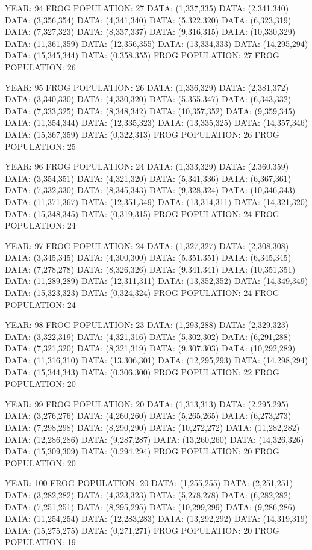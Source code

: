 \documentclass[12pt,a4paper]{article}
\begin{document}
{YEAR: 94
FROG POPULATION: 27
DATA: (1,337,335)
DATA: (2,341,340)
DATA: (3,356,354)
DATA: (4,341,340)
DATA: (5,322,320)
DATA: (6,323,319)
DATA: (7,327,323)
DATA: (8,337,337)
DATA: (9,316,315)
DATA: (10,330,329)
DATA: (11,361,359)
DATA: (12,356,355)
DATA: (13,334,333)
DATA: (14,295,294)
DATA: (15,345,344)
DATA: (0,358,355)
FROG POPULATION: 27
FROG POPULATION: 26

YEAR: 95
FROG POPULATION: 26
DATA: (1,336,329)
DATA: (2,381,372)
DATA: (3,340,330)
DATA: (4,330,320)
DATA: (5,355,347)
DATA: (6,343,332)
DATA: (7,333,325)
DATA: (8,348,342)
DATA: (10,357,352)
DATA: (9,359,345)
DATA: (11,354,344)
DATA: (12,335,323)
DATA: (13,335,325)
DATA: (14,357,346)
DATA: (15,367,359)
DATA: (0,322,313)
FROG POPULATION: 26
FROG POPULATION: 25

YEAR: 96
FROG POPULATION: 24
DATA: (1,333,329)
DATA: (2,360,359)
DATA: (3,354,351)
DATA: (4,321,320)
DATA: (5,341,336)
DATA: (6,367,361)
DATA: (7,332,330)
DATA: (8,345,343)
DATA: (9,328,324)
DATA: (10,346,343)
DATA: (11,371,367)
DATA: (12,351,349)
DATA: (13,314,311)
DATA: (14,321,320)
DATA: (15,348,345)
DATA: (0,319,315)
FROG POPULATION: 24
FROG POPULATION: 24

YEAR: 97
FROG POPULATION: 24
DATA: (1,327,327)
DATA: (2,308,308)
DATA: (3,345,345)
DATA: (4,300,300)
DATA: (5,351,351)
DATA: (6,345,345)
DATA: (7,278,278)
DATA: (8,326,326)
DATA: (9,341,341)
DATA: (10,351,351)
DATA: (11,289,289)
DATA: (12,311,311)
DATA: (13,352,352)
DATA: (14,349,349)
DATA: (15,323,323)
DATA: (0,324,324)
FROG POPULATION: 24
FROG POPULATION: 24

YEAR: 98
FROG POPULATION: 23
DATA: (1,293,288)
DATA: (2,329,323)
DATA: (3,322,319)
DATA: (4,321,316)
DATA: (5,302,302)
DATA: (6,291,288)
DATA: (7,321,320)
DATA: (8,321,319)
DATA: (9,307,303)
DATA: (10,292,289)
DATA: (11,316,310)
DATA: (13,306,301)
DATA: (12,295,293)
DATA: (14,298,294)
DATA: (15,344,343)
DATA: (0,306,300)
FROG POPULATION: 22
FROG POPULATION: 20

YEAR: 99
FROG POPULATION: 20
DATA: (1,313,313)
DATA: (2,295,295)
DATA: (3,276,276)
DATA: (4,260,260)
DATA: (5,265,265)
DATA: (6,273,273)
DATA: (7,298,298)
DATA: (8,290,290)
DATA: (10,272,272)
DATA: (11,282,282)
DATA: (12,286,286)
DATA: (9,287,287)
DATA: (13,260,260)
DATA: (14,326,326)
DATA: (15,309,309)
DATA: (0,294,294)
FROG POPULATION: 20
FROG POPULATION: 20

YEAR: 100
FROG POPULATION: 20
DATA: (1,255,255)
DATA: (2,251,251)
DATA: (3,282,282)
DATA: (4,323,323)
DATA: (5,278,278)
DATA: (6,282,282)
DATA: (7,251,251)
DATA: (8,295,295)
DATA: (10,299,299)
DATA: (9,286,286)
DATA: (11,254,254)
DATA: (12,283,283)
DATA: (13,292,292)
DATA: (14,319,319)
DATA: (15,275,275)
DATA: (0,271,271)
FROG POPULATION: 20
FROG POPULATION: 19
}
\end{document}
